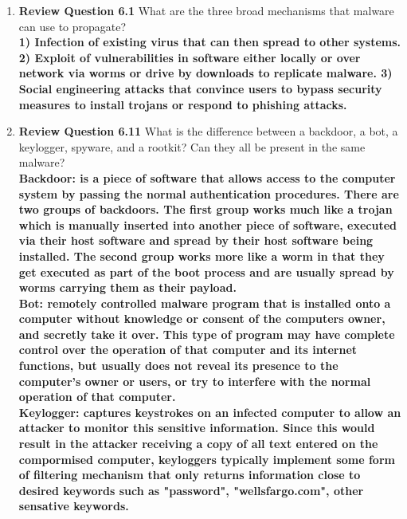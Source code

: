 \documentclass[12pt]{article}
\begin{document}
\renewcommand{\headrulewidth}{0.4pt}
\vspace{-3mm}
\begin{enumerate}
\item \textbf{Review Question 6.1} What are the three broad mechanisms that malware can use to propagate?  \\

\textbf{1) Infection of existing virus that can then spread to other systems. 2) Exploit of vulnerabilities in software either locally or over network via worms or drive by downloads to replicate malware. 3) Social engineering attacks that convince users to bypass security measures to install trojans or respond to phishing attacks.} \\

\item \textbf{Review Question 6.11} What is the difference between a backdoor, a bot, a keylogger, spyware, and a rootkit? Can they all be present in the same malware? \\

\textbf{Backdoor: is a piece of software that allows access to the computer system by passing the normal authentication procedures. There are two groups of backdoors. The first group works much like a trojan which is manually inserted into another piece of software, executed via their host software and spread by their host software being installed. The second group works more like a worm in that they get executed as part of the boot process and are usually spread by worms carrying them as their payload.} \\

\textbf{Bot: remotely controlled malware program that is installed onto a computer without knowledge or consent of the computers owner, and secretly take it over. This type of program may have complete control over the operation of that computer and its internet functions, but usually does not reveal its presence to the computer's owner or users, or try to interfere with the normal operation of that computer.} \\

\textbf{Keylogger: captures keystrokes on an infected computer to allow an attacker to monitor this sensitive information. Since this would result in the attacker receiving a copy of all text entered on the compormised computer, keyloggers typically implement some form of filtering mechanism that only returns information close to desired keywords such as "password", "wellsfargo.com", other sensative keywords.} \\


\end{enumerate}
\end{document}
